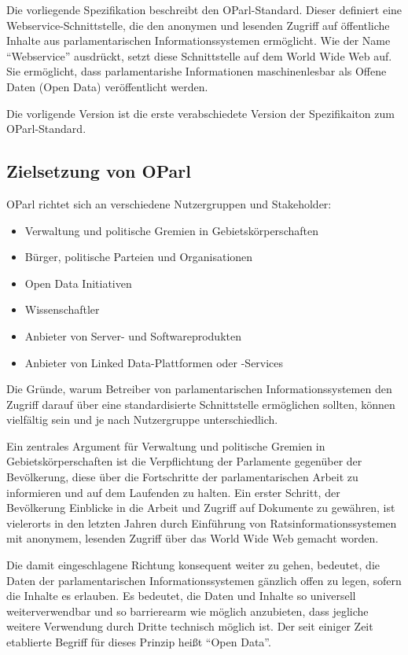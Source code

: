 \documentclass[,a4paper]{article}
\begin{document}
Die vorliegende Spezifikation beschreibt den OParl-Standard. Dieser
definiert eine Webservice-Schnittstelle, die den anonymen und lesenden
Zugriff auf öffentliche Inhalte aus parlamentarischen
Informationssystemen ermöglicht. Wie der Name ``Webservice'' ausdrückt,
setzt diese Schnittstelle auf dem World Wide Web auf. Sie ermöglicht,
dass parlamentarishe Informationen maschinenlesbar als Offene Daten
(Open Data) veröffentlicht werden.

Die vorligende Version ist die erste verabschiedete Version der
Spezifikaiton zum OParl-Standard.

\subsection{Zielsetzung von OParl}\label{zielsetzung-von-oparl}

OParl richtet sich an verschiedene Nutzergruppen und Stakeholder:

\begin{itemize}
\itemsep1pt\parskip0pt
\item
  Verwaltung und politische Gremien in Gebietskörperschaften
\item
  Bürger, politische Parteien und Organisationen
\item
  Open Data Initiativen
\item
  Wissenschaftler
\item
  Anbieter von Server- und Softwareprodukten
\item
  Anbieter von Linked Data-Plattformen oder -Services
\end{itemize}

Die Gründe, warum Betreiber von parlamentarischen Informationssystemen
den Zugriff darauf über eine standardisierte Schnittstelle ermöglichen
sollten, können vielfältig sein und je nach Nutzergruppe
unterschiedlich.

Ein zentrales Argument für Verwaltung und politische Gremien in
Gebietskörperschaften ist die Verpflichtung der Parlamente gegenüber der
Bevölkerung, diese über die Fortschritte der parlamentarischen Arbeit zu
informieren und auf dem Laufenden zu halten. Ein erster Schritt, der
Bevölkerung Einblicke in die Arbeit und Zugriff auf Dokumente zu
gewähren, ist vielerorts in den letzten Jahren durch Einführung von
Ratsinformationssystemen mit anonymem, lesenden Zugriff über das World
Wide Web gemacht worden.

Die damit eingeschlagene Richtung konsequent weiter zu gehen, bedeutet,
die Daten der parlamentarischen Informationssystemen gänzlich offen zu
legen, sofern die Inhalte es erlauben. Es bedeutet, die Daten und
Inhalte so universell weiterverwendbar und so barrierearm wie möglich
anzubieten, dass jegliche weitere Verwendung durch Dritte technisch
möglich ist. Der seit einiger Zeit etablierte Begriff für dieses Prinzip
heißt ``Open Data''.
\end{document}
